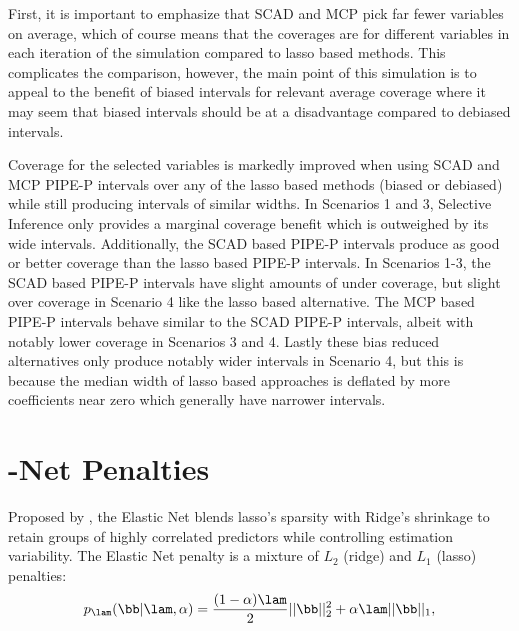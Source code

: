 \begin{table}[hbt!]
  \centering
  
  \caption{\label{tab:1-man3} Average coverage and median widths of intervals for selected features for PIPE-P using lasso, MCP, and SCAD penalties as well as three debiased methods across 4 set ups described in Section~\ref{sec:bias_v_debias}.}
\end{table}

First, it is important to emphasize that SCAD and MCP pick far fewer variables on average, which of course means that the coverages are for different variables in each iteration of the simulation compared to lasso based methods. This complicates the comparison, however, the main point of this simulation is to appeal to the benefit of biased intervals for relevant average coverage where it may seem that biased intervals should be at a disadvantage compared to debiased intervals.

Coverage for the selected variables is markedly improved when using SCAD and MCP PIPE-P intervals over any of the lasso based methods (biased or debiased) while still producing intervals of similar widths. In Scenarios 1 and 3, Selective Inference only provides a marginal coverage benefit which is outweighed by its wide intervals. Additionally, the SCAD based PIPE-P intervals produce as good or better coverage than the lasso based PIPE-P intervals. In Scenarios 1-3, the SCAD based PIPE-P intervals have slight amounts of under coverage, but slight over coverage in Scenario 4 like the lasso based alternative. The MCP based PIPE-P intervals behave similar to the SCAD PIPE-P intervals, albeit with notably lower coverage in Scenarios 3 and 4. Lastly these bias reduced alternatives only produce notably wider intervals in Scenario 4, but this is because the median width of lasso based approaches is deflated by more coefficients near zero which generally have narrower intervals.

\section{-Net Penalties}
\label{sec:enet}

Proposed by \cite{zou2005regularization}, the Elastic Net blends lasso's sparsity with Ridge's shrinkage to retain groups of highly correlated predictors while controlling estimation variability. The Elastic Net penalty is a mixture of $L_2$ (ridge) and $L_1$ (lasso) penalties:
$$
p_\lam(\bb | \lam, \alpha) = \frac{(1 - \alpha) \lam }{2} ||\bb||^2_2 + \alpha \lam ||\bb||_1,
$$

